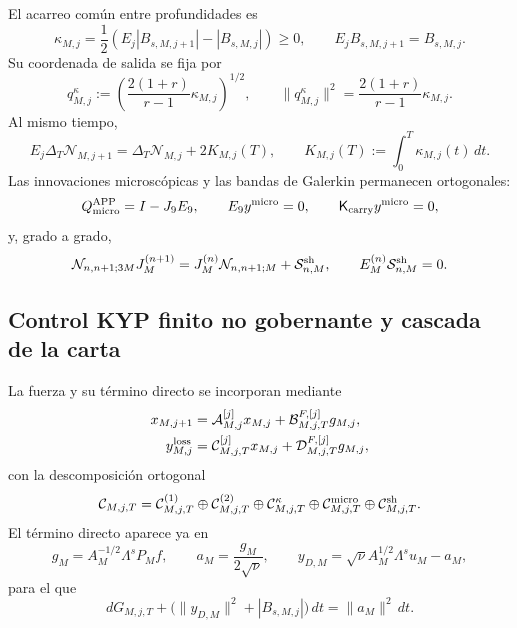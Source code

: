 El acarreo común entre profundidades es
\begin{equation}
 \kappa_{M,j}
 =\frac12\left(E_j|B_{s,M,j+1}|-|B_{s,M,j}|\right)\ge0,
 \qquad
 E_jB_{s,M,j+1}=B_{s,M,j}.
 \label{eq:ns-import-carry}
\end{equation}
Su coordenada de salida se fija por
\begin{equation}
 q_{M,j}^{\kappa}
 :=\left(\frac{2(1+r)}{r-1}\kappa_{M,j}\right)^{1/2},
 \qquad
 \|q_{M,j}^{\kappa}\|^2
 =\frac{2(1+r)}{r-1}\kappa_{M,j}.
 \label{eq:ns-import-carry-port}
\end{equation}
Al mismo tiempo,
\begin{equation}
 E_j\Delta_T\mathcal N_{M,j+1}
 =\Delta_T\mathcal N_{M,j}+2K_{M,j}(T),
 \qquad
 K_{M,j}(T):=\int_0^T\kappa_{M,j}(t)\,dt.
 \label{eq:ns-import-carry-telescope}
\end{equation}
Las innovaciones microscópicas y las bandas de Galerkin permanecen
ortogonales:
\begin{equation}
 Q_{\rm micro}^{\rm APP}=I-J_9E_9,
 \qquad E_9y^{\rm micro}=0,
 \qquad \mathsf K_{\rm carry}y^{\rm micro}=0,
 \label{eq:ns-import-micro}
\end{equation}
y, grado a grado,
\begin{equation}
 \mathcal N_{n,n+1;3M}J_M^{(n+1)}
 =J_M^{(n)}\mathcal N_{n,n+1;M}
 +\mathcal S_{n,M}^{\rm sh},
 \qquad
 E_M^{(n)}\mathcal S_{n,M}^{\rm sh}=0.
 \label{eq:ns-import-shell}
\end{equation}

\subsection{Control KYP finito no gobernante y cascada de la carta}

La fuerza y su término directo se incorporan mediante
\begin{equation}
 \begin{aligned}
 x_{M,j+1}
 &=\mathcal A_{M,j}^{[j]}x_{M,j}
   +\mathcal B_{M,j,T}^{F,[j]}g_{M,j},\\
 y_{M,j}^{\rm loss}
 &=\mathcal C_{M,j,T}^{[j]}x_{M,j}
   +\mathcal D_{M,j,T}^{F,[j]}g_{M,j},
 \end{aligned}
 \label{eq:ns-import-affine-step}
\end{equation}
con la descomposición ortogonal
\begin{equation}
 \mathcal C_{M,j,T}
 =\mathcal C_{M,j,T}^{(1)}
 \oplus\mathcal C_{M,j,T}^{(2)}
 \oplus\mathcal C_{M,j,T}^{\kappa}
 \oplus\mathcal C_{M,j,T}^{\rm micro}
 \oplus\mathcal C_{M,j,T}^{\rm sh}.
 \label{eq:ns-import-loss-decomposition}
\end{equation}
El término directo aparece ya en
\[
 g_M=A_M^{-1/2}\Lambda^sP_Mf,
 \qquad
 a_M=\frac{g_M}{2\sqrt\nu},
 \qquad
 y_{D,M}=\sqrt\nu A_M^{1/2}\Lambda^su_M-a_M,
\]
para el que
\begin{equation}
 dG_{M,j,T}
 +\bigl(\|y_{D,M}\|^2+|B_{s,M,j}|\bigr)\,dt
 =\|a_M\|^2\,dt.
 \label{eq:ns-import-force-feedthrough}
\end{equation}

